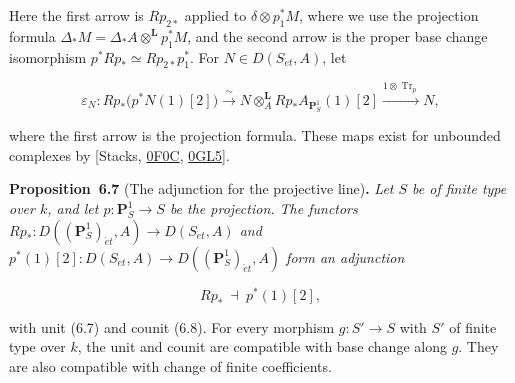 \documentclass[11pt]{article}
\newenvironment{bpstatement}[2]{\par\addvspace{0.6\baselineskip}\noindent\textbf{#1}#2\textbf{.}\enspace\ignorespaces}
  {\par\addvspace{0.4\baselineskip}}
\newenvironment{bpstatementit}[2]{\begin{bpstatement}{#1}{#2}\itshape\ignorespaces}{\end{bpstatement}}
\begin{document}
Here the first arrow is \(Rp_{2*}\) applied to \(\delta\otimes p_1^*M\), where we use the projection formula \(\Delta_*M=\Delta_*A\otimes^{\mathbf L}p_1^*M\), and the second arrow is the proper base change isomorphism \(p^*Rp_*\simeq Rp_{2*}p_1^*\). For \(N\in D(S_{\acute{e}t},A)\), let

\[
\varepsilon_N:Rp_*\bigl(p^*N(1)[2]\bigr)
\xrightarrow{\ \sim\ }N\otimes_A^{\mathbf L}
Rp_*A_{\mathbf P^1_S}(1)[2]
\xrightarrow{1\otimes \operatorname{Tr}_p}N,
\tag{6.8}
\]

where the first arrow is the projection formula. These maps exist for unbounded complexes by [Stacks, \href{https://stacks.math.columbia.edu/tag/0F0C}{0F0C}, \href{https://stacks.math.columbia.edu/tag/0GL5}{0GL5}].

\label{bp534}%
\begin{bpstatementit}{Proposition~6.7}{ (The adjunction for the projective line)}
Let \(S\) be of finite type over \(k\), and let \(p:\mathbf P^1_S\to S\) be the projection. The functors \(Rp_*:D((\mathbf P^1_S)_{\acute{e}t},A)\to
D(S_{\acute{e}t},A)\) and \(p^*(1)[2]:D(S_{\acute{e}t},A)\to
D((\mathbf P^1_S)_{\acute{e}t},A)\) form an adjunction

\[
Rp_* \ \dashv\ p^*(1)[2],
\tag{6.9}
\]

with unit (6.7) and counit (6.8). For every morphism \(g:S'\to S\) with \(S'\) of finite type over \(k\), the unit and counit are compatible with base change along \(g\). They are also compatible with change of finite coefficients.
\end{bpstatementit}
\end{document}
